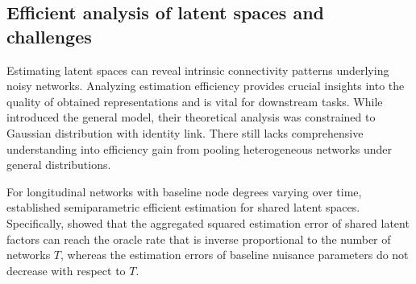 \documentclass[12pt]{article}
\begin{document}



\subsection{Efficient analysis of latent spaces and challenges} \label{sec:challenges}

Estimating latent spaces can reveal intrinsic connectivity patterns underlying noisy networks. 
Analyzing estimation efficiency provides crucial insights into the quality of obtained representations and is vital for downstream tasks. 
While \cite{macdonald2022latent} introduced the general model, their theoretical analysis was  constrained to Gaussian distribution with identity link. There still lacks comprehensive  understanding into efficiency gain from pooling heterogeneous networks under general distributions.   

For longitudinal networks with  baseline  node degrees varying over time, \cite{he2023semiparametric}   established semiparametric efficient estimation for shared latent spaces. 
Specifically, \cite{he2023semiparametric} 
showed that the aggregated squared estimation error of  shared latent factors can reach the oracle rate that is inverse proportional to the number of networks $T$, whereas the estimation errors of baseline nuisance parameters do not decrease with respect to $T$. 
\end{document}
